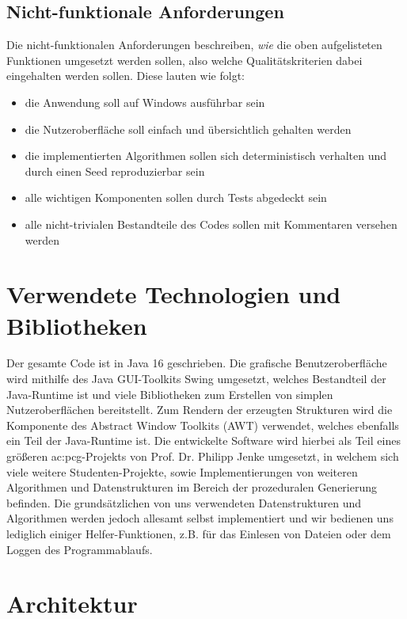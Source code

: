 \subsection{Nicht-funktionale Anforderungen}
Die nicht-funktionalen Anforderungen beschreiben, \textit{wie} die oben aufgelisteten Funktionen umgesetzt werden sollen, also
welche Qualitätskriterien dabei eingehalten werden sollen. Diese lauten wie folgt:

\begin{itemize}
    \item die Anwendung soll auf Windows ausführbar sein
    \item die Nutzeroberfläche soll einfach und übersichtlich gehalten werden
    \item die implementierten Algorithmen sollen sich deterministisch verhalten und durch einen Seed reproduzierbar sein
    \item alle wichtigen Komponenten sollen durch Tests abgedeckt sein
    \item alle nicht-trivialen Bestandteile des Codes sollen mit Kommentaren versehen werden
\end{itemize}

\section{Verwendete Technologien und Bibliotheken}
Der gesamte Code ist in Java 16 geschrieben. Die grafische Benutzeroberfläche wird mithilfe des Java GUI-Toolkits Swing umgesetzt,
welches Bestandteil der Java-Runtime ist und viele Bibliotheken zum Erstellen von simplen Nutzeroberflächen bereitstellt. Zum Rendern
der erzeugten Strukturen wird die  Komponente des Abstract Window Toolkits (AWT) verwendet, welches ebenfalls ein
Teil der Java-Runtime ist. Die entwickelte Software wird hierbei als Teil eines größeren \gls{ac:pcg}-Projekts von Prof. Dr. Philipp Jenke umgesetzt,
in welchem sich viele weitere Studenten-Projekte, sowie Implementierungen von weiteren Algorithmen und Datenstrukturen im Bereich der prozeduralen
Generierung befinden. Die grundsätzlichen von uns verwendeten Datenstrukturen und Algorithmen werden jedoch allesamt selbst implementiert
und wir bedienen uns lediglich einiger Helfer-Funktionen, z.B. für das Einlesen von Dateien oder dem Loggen des Programmablaufs.

\section{Architektur}

